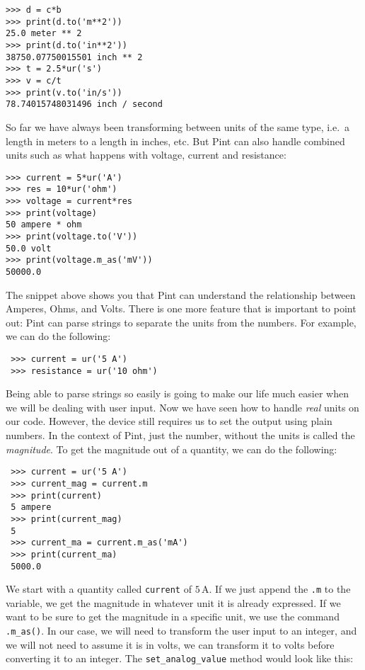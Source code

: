 \begin{verbatim}
>>> d = c*b
>>> print(d.to('m**2'))
25.0 meter ** 2
>>> print(d.to('in**2'))
38750.07750015501 inch ** 2
>>> t = 2.5*ur('s')
>>> v = c/t
>>> print(v.to('in/s'))
78.74015748031496 inch / second
\end{verbatim}

So far we have always been transforming between units of the same type, i.e.\ a length in meters to a length in inches, etc. But Pint can also handle combined units such as what happens with voltage, current and resistance:

\begin{verbatim}
>>> current = 5*ur('A')
>>> res = 10*ur('ohm')
>>> voltage = current*res
>>> print(voltage)
50 ampere * ohm
>>> print(voltage.to('V'))
50.0 volt
>>> print(voltage.m_as('mV'))
50000.0
\end{verbatim}

The snippet above shows you that Pint can understand the relationship between Amperes, Ohms, and Volts. There is one more feature that is important to point out: Pint can parse strings to separate the units from the numbers. For example, we can do the following:

\begin{verbatim}
 >>> current = ur('5 A')
 >>> resistance = ur('10 ohm')
\end{verbatim}

Being able to parse strings so easily is going to make our life much easier when we will be dealing with user input. Now we have seen how to handle \emph{real} units on our code. However, the device still requires us to set the output using plain numbers. In the context of Pint, just the number, without the units is called the \emph{magnitude}. To get the magnitude out of a quantity, we can do the following:

\begin{verbatim}
 >>> current = ur('5 A')
 >>> current_mag = current.m
 >>> print(current)
 5 ampere
 >>> print(current_mag)
 5
 >>> current_ma = current.m_as('mA')
 >>> print(current_ma)
 5000.0
\end{verbatim}

We start with a quantity called \texttt{current} of $5\,\textrm{A}$. If we just append the \texttt{.m} to the variable, we get the magnitude in whatever unit it is already expressed. If we want to be sure to get the magnitude in a specific unit, we use the command \texttt{.m\_as()}. In our case, we will need to transform the user input to an integer, and we will not need to assume it is in volts, we can transform it to volts before converting it to an integer. The \texttt{set\_analog\_value} method would look like this:

